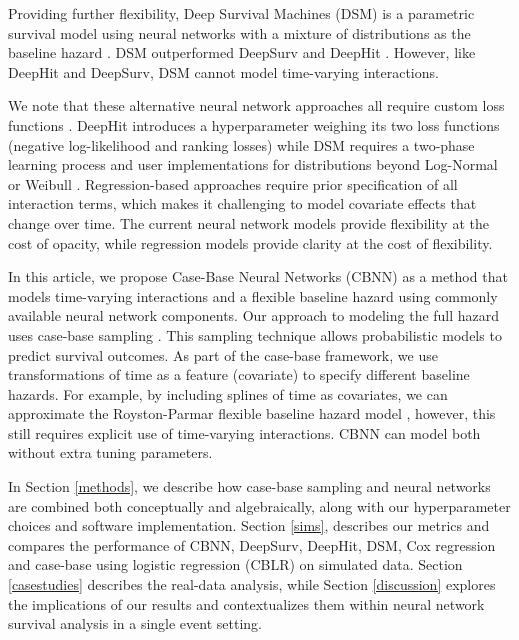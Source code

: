 \documentclass[APA,LATO1COL]{WileyNJD-v2}
\begin{document}
Providing further flexibility, Deep Survival Machines (DSM) is a
parametric survival model using neural networks with a mixture of
distributions as the baseline hazard \citep{dsmPaper}. DSM outperformed DeepSurv and DeepHit
\citep{dsmPaper}. However, like DeepHit and DeepSurv, DSM cannot model
time-varying interactions.

We note that these alternative neural network approaches all require
custom loss functions \citep{katzman2018DeepSurv} \citep{lee2018DeepHit}
\citep{dsmPaper}. DeepHit introduces a hyperparameter weighing its two
loss functions (negative log-likelihood and ranking losses) while DSM
requires a two-phase learning process and user implementations for
distributions beyond Log-Normal or Weibull \citep{lee2018DeepHit}
\citep{dsmPaper}. Regression-based approaches require prior
specification of all interaction terms, which makes it challenging to
model covariate effects that change over time. The current neural
network models provide flexibility at the cost of opacity, while
regression models provide clarity at the cost of flexibility.

In this article, we propose Case-Base Neural Networks (CBNN) as a method
that models time-varying interactions and a flexible baseline hazard
using commonly available neural network components. Our approach to
modeling the full hazard uses case-base sampling \citep{hanley2009}.
This sampling technique allows probabilistic models to predict survival
outcomes. As part of the case-base framework, we use transformations of
time as a feature (covariate) to specify different baseline hazards. For
example, by including splines of time as covariates, we can approximate
the Royston-Parmar flexible baseline hazard model
\citep{royston2002flexible}, however, this still requires explicit use
of time-varying interactions. CBNN can model both without extra tuning
parameters.

In Section \ref{methods}, we describe how case-base sampling and neural
networks are combined both conceptually and algebraically, along with
our hyperparameter choices and software implementation. Section
\ref{sims}, describes our metrics and compares the performance of CBNN,
DeepSurv, DeepHit, DSM, Cox regression and case-base using logistic
regression (CBLR) on simulated data. Section \ref{casestudies} describes
the real-data analysis, while Section \ref{discussion} explores the
implications of our results and contextualizes them within neural
network survival analysis in a single event setting.
\end{document}
